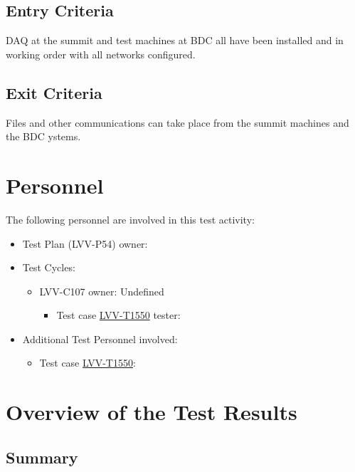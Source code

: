 \documentclass[DM,lsstdraft,STR,toc]{lsstdoc}
\begin{document}
  \subsection{Entry Criteria}
  DAQ at the summit and test machines at BDC all have been installed and
in working order with all networks configured.~~


  \subsection{Exit Criteria}
  Files and other communications can take place from the summit machines
and the BDC ystems.~~



\newpage
\section{Personnel}
\label{sect:personnel}

The following personnel are involved in this test activity:

\begin{itemize}
\item Test Plan (LVV-P54) owner: 
\item Test Cycles:
\begin{itemize}
  \item LVV-C107 owner: 
    Undefined
  \begin{itemize}
    \item Test case \href{https://jira.lsstcorp.org/secure/Tests.jspa#/testCase/LVV-T1550}{LVV-T1550} tester: 
  \end{itemize}
\end{itemize}
\item Additional Test Personnel involved:
  \begin{itemize}
    \item Test case \href{https://jira.lsstcorp.org/secure/Tests.jspa#/testCase/LVV-T1550}{LVV-T1550}: 
  \end{itemize}
\end{itemize}

\newpage

\section{Overview of the Test Results}
\label{sect:overview}

\subsection{Summary}
\label{sect:summarytable}
\end{document}
